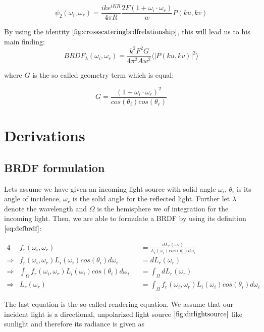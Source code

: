 \begin{equation}
\psi_{2}(\omega_i, \omega_r) = \frac{i k e^{i K R}}{4 \pi R} \frac{2F(1 + \omega_i \cdot \omega_r)}{w} P(ku, kv)
\label{eq:kirchhoffFinding}
\end{equation}

By using the identity $\ref{fig:crossscateringbrdfrelationship}$, this will lead us to his main finding:
\begin{equation} 
  BRDF_{\lambda}(\omega_i, \omega_r) = \frac{k^2 F^2 G}{4\pi^2 A w^2} \langle \left|P(ku, kv)\right|^2\rangle
\label{eq:mainstam}
\end{equation}

where $G$ is the so called geometry term which is equal: 

\begin{equation}
  G =\frac{(1 + \omega_i \cdot \omega_r)^2}{cos(\theta_i)cos(\theta_r)}
\label{eq:geometricterm}
\end{equation}

\section{Derivations}
\subsection{BRDF formulation}
Lets assume we have given an incoming light source with solid angle $\omega_i$, $\theta_i$ is its angle of incidence, $\omega_r$ is the solid angle for the reflected light. Further let $\lambda$ denote the wavelength and $\Omega$ is the hemisphere we of integration for the incoming light. Then, we are able to formulate a BRDF by using its definition $\ref{eq:defbrdf}$:  

\begin{alignat}{4}
& f_r(\omega_i, \omega_r) &&= \frac{dL_r(\omega_r)}{L_i(\omega_i)cos(\theta_i)d\omega_i} \nonumber \\
\Rightarrow{} & f_r(\omega_i, \omega_r) L_i(\omega_i)cos(\theta_i)d\omega_i &&= dL_r(\omega_r) \nonumber \\
\Rightarrow{} & \int_{\Omega}f_r(\omega_i, \omega_r) L_i(\omega_i)cos(\theta_i)d\omega_i &&= \int_{\Omega}dL_r(\omega_r) \nonumber\\
\Rightarrow{} & L_r(\omega_r) &&= \int_{\Omega}f_r(\omega_i, \omega_r) L_i(\omega_i)cos(\theta_i)d\omega_i
\label{eq:initialbrdf}
\end{alignat}

The last equation is the so called rendering equation.$\label{sec:dirlighsourceassumption}$ We assume that our incident light is a directional, unpolarized light source $\ref{fig:dirlightsource}$ like sunlight and therefore its radiance is given as 

